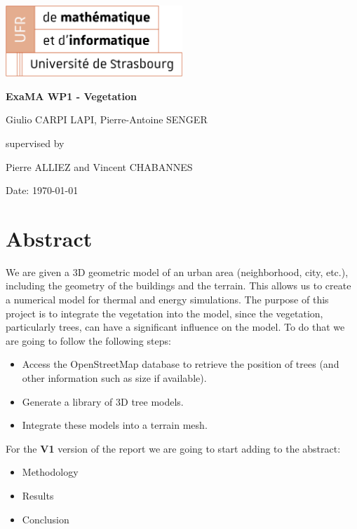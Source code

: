 \documentclass[12pt]{article}
\begin{document}
\begin{titlepage}
    \centering
    \includegraphics[width=0.5\textwidth]{images/logo_ufr.png}\par\vspace{1cm}
    \vspace{1.5cm}
    {\huge\bfseries ExaMA WP1 - Vegetation\par}
    \vspace{2cm}
    {\Large Giulio CARPI LAPI, Pierre-Antoine SENGER\par}
    \vfill
    supervised by\par
    Pierre ALLIEZ and Vincent CHABANNES

    \vfill

    {\large Date: \today\par}
\end{titlepage}

\tableofcontents
\newpage

\section{Abstract}
We are given a 3D geometric model of an urban area (neighborhood, city, etc.),
including the geometry of the buildings and the terrain.
This allows us to create a numerical model for thermal and energy simulations.
The purpose of this project is to integrate the vegetation into the model,
since the vegetation, particularly trees,
can have a significant influence on the model.
To do that we are going to follow the following steps:

\begin{itemize}
    \item Access the OpenStreetMap database to retrieve the position of trees
    (and other information such as size if available).
    \item Generate a library of 3D tree models.
    \item Integrate these models into a terrain mesh.
\end{itemize}

For the \textbf{V1} version of the report we are going to start adding
to the abstract:

\begin{itemize}
    \item Methodology
    \item Results
    \item Conclusion
\end{itemize}
\end{document}
